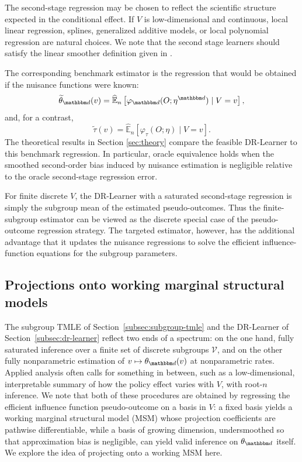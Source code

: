 \documentclass[11pt]{article}
\begin{document}
The second-stage regression may be chosen to reflect the scientific structure
expected in the conditional effect. If \(V\) is low-dimensional and continuous,
local linear regression, splines, generalized additive models, or local
polynomial regression are natural choices. We note that 
the second stage learners should satisfy the linear smoother definition
given in \cite{kennedyOptimalDoublyRobust2023a}.

The corresponding benchmark estimator is the regression that would be obtained
if the nuisance functions were known:
\[
  \widetilde\theta_{\mathbbm d}(v)
  =
  \widehat{\mathbb{E}}_n
  \left[
    \varphi_{\mathbbm d}(O;\eta^{\mathbbm d})
    \mid V=v
  \right],
\]
and, for a contrast,
\[
  \widetilde\tau(v)
  =
  \widehat{\mathbb{E}}_n
  \left[
    \varphi_{\tau}(O;\eta)
    \mid V=v
  \right].
\]
The theoretical results in Section \ref{sec:theory} compare the feasible
DR-Learner to this benchmark regression. In particular, oracle equivalence holds
when the smoothed second-order bias induced by nuisance estimation is negligible
relative to the oracle second-stage regression error.

\begin{remark}
For finite discrete \(V\), the DR-Learner with a saturated second-stage
regression is simply the subgroup mean of the estimated pseudo-outcomes. Thus
the finite-subgroup estimator can be viewed as the discrete special case of the
pseudo-outcome regression strategy. The targeted estimator, however, has the
additional advantage that it updates the nuisance regressions to solve the
efficient influence-function equations for the subgroup parameters.
\end{remark}

\subsection{Projections onto working marginal structural models}
\label{subsec:msm-projection}

The subgroup TMLE of Section~\ref{subsec:subgroup-tmle} and the DR-Learner of
Section~\ref{subsec:dr-learner} reflect two ends of a spectrum: on 
the one hand, fully saturated inference
over a finite set of discrete subgroups \(\mathcal V\), and on the other fully nonparametric estimation of
\(v\mapsto\theta_{\d}(v)\) at nonparametric rates. Applied analysis often
calls for something in between, such as a low-dimensional, interpretable summary of
how the policy effect varies with \(V\), with root-\(n\) inference. We note that both 
of these procedures are obtained by regressing the efficient influence function pseudo-outcome on a basis in
\(V\): a fixed basis yields a working marginal structural model (MSM)
whose projection coefficients are pathwise differentiable, while a basis of
growing dimension, undersmoothed so that approximation bias is
negligible, can yield valid inference on \(\theta_{\d}\) itself. We explore
the idea of projecting onto a working MSM here. 
\end{document}

